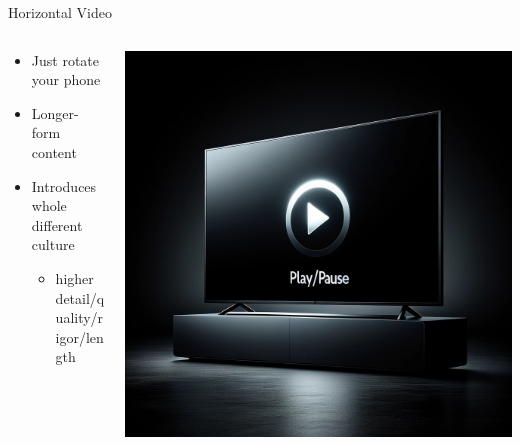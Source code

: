 \documentclass[aspectratio=169]{beamer}
\begin{document}
\begin{frame}{Horizontal Video}
\begin{columns}[T]
    \begin{column}[T]{0.5\textwidth}
        \begin{itemize}
            \item Just rotate your phone
                \item Longer-form content
                \item Introduces whole different culture
                \begin{itemize}
                    \item higher detail/quality/rigor/length
                \end{itemize}
        \end{itemize}
    \end{column}
    \begin{column}{0.5\textwidth}
        \includegraphics[height=0.8\textheight]{imgs/media/horizontal_vid.jpeg}
    \end{column}
\end{columns}
\end{frame}
\end{document}
